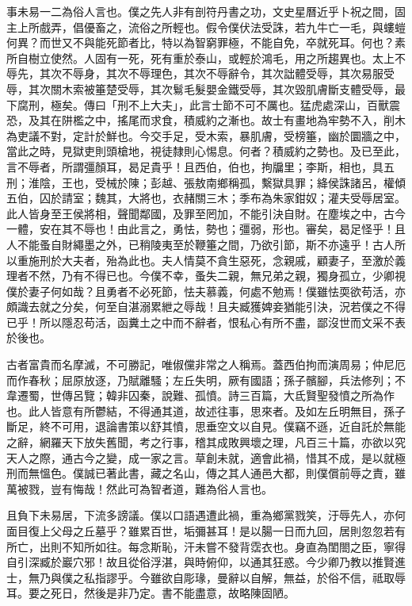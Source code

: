 \begin{pinyinscope}
事未易一二為俗人言也。僕之先人非有剖符丹書之功，文史星曆近乎卜祝之間，固主上所戲弄，倡優畜之，流俗之所輕也。假令僕伏法受誅，若九牛亡一毛，與螻螘何異？而世又不與能死節者比，特以為智窮罪極，不能自免，卒就死耳。何也？素所自樹立使然。人固有一死，死有重於泰山，或輕於鴻毛，用之所趨異也。太上不辱先，其次不辱身，其次不辱理色，其次不辱辭令，其次詘體受辱，其次易服受辱，其次關木索被箠楚受辱，其次鬄毛髮嬰金鐵受辱，其次毀肌膚斷支體受辱，最下腐刑，極矣。傳曰「刑不上大夫」，此言士節不可不厲也。猛虎處深山，百獸震恐，及其在阱檻之中，搖尾而求食，積威約之漸也。故士有畫地為牢勢不入，削木為吏議不對，定計於鮮也。今交手足，受木索，暴肌膚，受榜箠，幽於圜牆之中，當此之時，見獄吏則頭槍地，視徒隸則心惕息。何者？積威約之勢也。及已至此，言不辱者，所謂彊顏耳，曷足貴乎！且西伯，伯也，拘牖里；李斯，相也，具五刑；淮陰，王也，受械於陳；彭越、張敖南鄉稱孤，繫獄具罪；絳侯誅諸呂，權傾五伯，囚於請室；魏其，大將也，衣赭關三木；季布為朱家鉗奴；灌夫受辱居室。此人皆身至王侯將相，聲聞鄰國，及罪至罔加，不能引決自財。在塵埃之中，古今一體，安在其不辱也！由此言之，勇怯，勢也；彊弱，形也。審矣，曷足怪乎！且人不能蚤自財繩墨之外，已稍陵夷至於鞭箠之間，乃欲引節，斯不亦遠乎！古人所以重施刑於大夫者，殆為此也。夫人情莫不貪生惡死，念親戚，顧妻子，至激於義理者不然，乃有不得已也。今僕不幸，蚤失二親，無兄弟之親，獨身孤立，少卿視僕於妻子何如哉？且勇者不必死節，怯夫慕義，何處不勉焉！僕雖怯耎欲苟活，亦頗識去就之分矣，何至自湛溺累紲之辱哉！且夫臧獲婢妾猶能引決，況若僕之不得已乎！所以隱忍苟活，函糞土之中而不辭者，恨私心有所不盡，鄙沒世而文采不表於後也。

古者富貴而名摩滅，不可勝記，唯俶儻非常之人稱焉。蓋西伯拘而演周易；仲尼厄而作春秋；屈原放逐，乃賦離騷；左丘失明，厥有國語；孫子髕腳，兵法修列；不韋遷蜀，世傳呂覽；韓非囚秦，說難、孤憤。詩三百篇，大氐賢聖發憤之所為作也。此人皆意有所鬱結，不得通其道，故述往事，思來者。及如左丘明無目，孫子斷足，終不可用，退論書策以舒其憤，思垂空文以自見。僕竊不遜，近自託於無能之辭，網羅天下放失舊聞，考之行事，稽其成敗興壞之理，凡百三十篇，亦欲以究天人之際，通古今之變，成一家之言。草創未就，適會此禍，惜其不成，是以就極刑而無慍色。僕誠已著此書，藏之名山，傳之其人通邑大都，則僕償前辱之責，雖萬被戮，豈有悔哉！然此可為智者道，難為俗人言也。

且負下未易居，下流多謗議。僕以口語遇遭此禍，重為鄉黨戮笑，汙辱先人，亦何面目復上父母之丘墓乎？雖累百世，垢彌甚耳！是以腸一日而九回，居則忽忽若有所亡，出則不知所如往。每念斯恥，汗未嘗不發背霑衣也。身直為閨閤之臣，寧得自引深臧於巖穴邪！故且從俗浮湛，與時俯仰，以通其狂惑。今少卿乃教以推賢進士，無乃與僕之私指謬乎。今雖欲自彫瑑，曼辭以自解，無益，於俗不信，祗取辱耳。要之死日，然後是非乃定。書不能盡意，故略陳固陋。


\end{pinyinscope}
